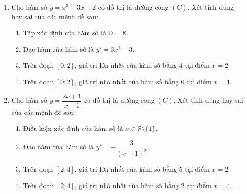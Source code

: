 \documentclass[12pt]{article}
\begin{document}
\begin{enumerate}[label=\textbf{Câu \arabic*.}]
\begin{center}
		\end{center}
		Xét tính đúng hay sai của các mệnh đề sau:
		\begin{enumerate}[label=\alph*)]
			\item Hàm số $y = f(x)$ nghịch biến trên khoảng $(-1; 2)$.
			\item Trên đoạn $[-1; 2]$, hàm số đạt giá trị lớn nhất bằng $f(-1)$ và giá trị nhỏ nhất bằng $f(2)$.
			\item Trên nửa khoảng $(-1; 2]$, hàm số có giá trị nhỏ nhất là $f(2)$ nhưng không có giá trị lớn nhất.
			\item Trên khoảng $(-\infty; 2)$, hàm số đã cho không có giá trị lớn nhất.
		\end{enumerate}
		
		
		\item Cho hàm số $y = x^3 - 3x + 2$ có đồ thị là đường cong $(C)$. Xét tính đúng hay sai của các mệnh đề sau:
		\begin{enumerate}[label=\alph*)]
			\item Tập xác định của hàm số là $\mathbb{D} = \mathbb{R}$.
			\item Đạo hàm của hàm số là $y' = 3x^2 - 3$.
			\item Trên đoạn $[0; 2]$, giá trị lớn nhất của hàm số bằng $4$ tại điểm $x = 2$.
			\item Trên đoạn $[0; 2]$, giá trị nhỏ nhất của hàm số bằng $0$ tại điểm $x = 1$.
		\end{enumerate}
		
		\item Cho hàm số $y = \dfrac{2x + 1}{x - 1}$ có đồ thị là đường cong $(C)$. Xét tính đúng hay sai của các mệnh đề sau:
		\begin{enumerate}[label=\alph*)]
			\item Điều kiện xác định của hàm số là $x \in \mathbb{R} \setminus \{1\}$.
			\item Đạo hàm của hàm số là $y' = -\dfrac{3}{(x-1)^2}$.
			\item Trên đoạn $[2; 4]$, giá trị lớn nhất của hàm số bằng $5$ tại điểm $x = 2$.
			\item Trên đoạn $[2; 4]$, giá trị nhỏ nhất của hàm số bằng $2$ tại điểm $x = 4$.
		\end{enumerate}
		

\end{enumerate}
\end{document}
